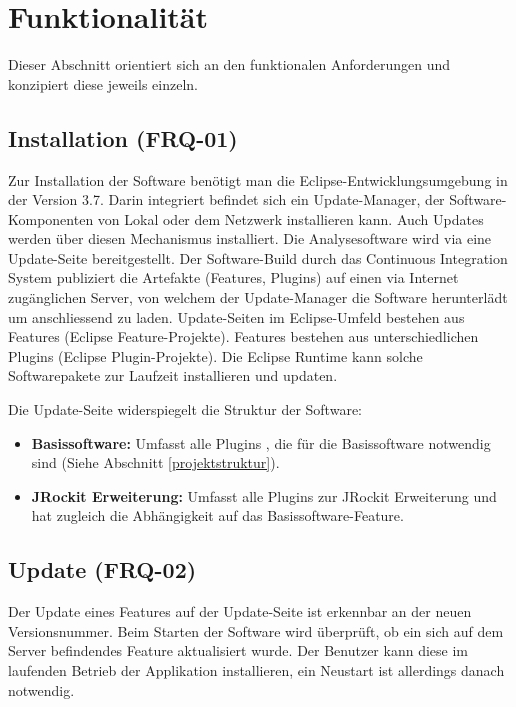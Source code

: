 \chapter{Funktionalität}\label{konzept_2}
Dieser Abschnitt orientiert sich an den funktionalen Anforderungen und konzipiert diese jeweils einzeln. 

\section{Installation (FRQ-01)}\label{installation}
Zur Installation der Software benötigt man die Eclipse-Entwicklungsumgebung in der Version 3.7. Darin integriert befindet sich ein Update-Manager, der Software-Komponenten von Lokal oder dem Netzwerk installieren kann. Auch Updates werden über diesen Mechanismus installiert. Die Analysesoftware wird via eine Update-Seite bereitgestellt. Der Software-Build durch das Continuous Integration System publiziert die Artefakte (Features, Plugins) auf einen via Internet zugänglichen Server, von welchem der Update-Manager die Software herunterlädt um anschliessend zu laden. Update-Seiten im Eclipse-Umfeld bestehen aus Features (Eclipse Feature-Projekte). Features bestehen aus unterschiedlichen Plugins (Eclipse Plugin-Projekte). Die Eclipse Runtime kann solche Softwarepakete zur Laufzeit installieren und updaten.

Die Update-Seite widerspiegelt die Struktur der Software:
\begin{itemize}
\item \textbf{Basissoftware:} Umfasst alle Plugins , die für die Basissoftware notwendig sind (Siehe Abschnitt \ref{projektstruktur}).
\item \textbf{JRockit Erweiterung: }Umfasst alle Plugins zur JRockit Erweiterung und hat zugleich die Abhängigkeit auf das Basissoftware-Feature.
\end{itemize}

\section{Update (FRQ-02)}
Der Update eines Features auf der Update-Seite ist erkennbar an der neuen Versionsnummer. Beim Starten der Software wird überprüft, ob ein sich auf dem Server befindendes Feature aktualisiert wurde. Der Benutzer kann diese im laufenden Betrieb der Applikation installieren, ein Neustart ist allerdings danach notwendig.

